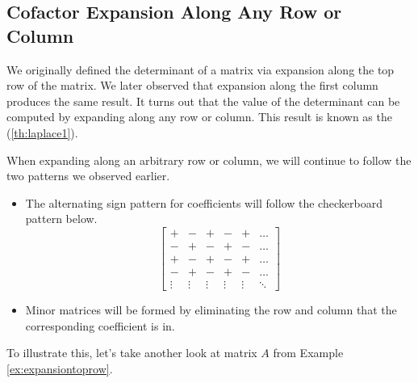 \documentclass{ximera}
\begin{document}
\subsection*{Cofactor Expansion Along Any Row or Column}

We originally defined the determinant of a matrix via expansion along the top row of the matrix.  We later observed that expansion along the first column produces the same result.  It turns out that the value of the determinant can be computed by expanding along any row or column.  This result is known as the  (\ref{th:laplace1}).

When expanding along an arbitrary row or column, we will continue to follow the two patterns we observed earlier.
\begin{itemize}
    \item The alternating sign pattern for coefficients will follow the checkerboard pattern below.
 $$\begin{bmatrix}+&-&+&-&+&\ldots\\-&+&-&+&-&\ldots\\
 +&-&+&-&+&\ldots\\-&+&-&+&-&\ldots\\\vdots &\vdots  & \vdots & \vdots &\vdots &\ddots \end{bmatrix}$$
 \item Minor matrices will be formed by eliminating the row and column that the corresponding coefficient is in.
\end{itemize}

To illustrate this, let's take another look at matrix $A$ from Example \ref{ex:expansiontoprow}. 
\end{document}
